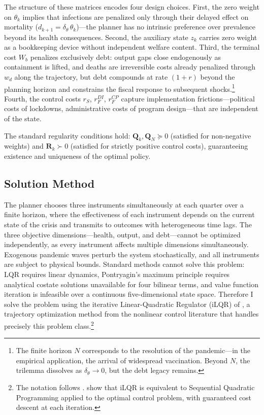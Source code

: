 \documentclass[12pt, a4paper]{article}
\begin{document}
\vspace{2mm}

\noindent The structure of these matrices encodes four design choices. First, the zero weight on $\theta_k$ implies that infections are penalized only through their delayed effect on mortality ($d_{k+1} = \delta_\theta\, \theta_k$)---the planner has no intrinsic
preference over prevalence beyond its health consequences. Second, the auxiliary state
$z_k$ carries zero weight as a bookkeeping device without independent welfare content.
Third, the terminal cost $W_b$ penalizes exclusively debt: output gaps close
endogenously as containment is lifted, and deaths are irreversible costs already
penalized through $w_d$ along the trajectory, but debt compounds at rate $(1+r)$
beyond the planning horizon and constrains the fiscal response to subsequent
shocks.\footnote{The finite horizon $N$ corresponds to the resolution of the
pandemic---in the empirical application, the arrival of widespread vaccination.
Beyond $N$, the trilemma dissolves as $\delta_\theta \to 0$, but the debt legacy
remains.} Fourth, the control costs $r_S$, $r_F^{DI}$, $r_F^{CP}$ capture
implementation frictions---political costs of lockdowns, administrative costs of
program design---that are independent of the state.

The standard regularity conditions hold: $\bm{Q}_k, \bm{Q}_N \succeq 0$ (satisfied
for non-negative weights) and $\bm{R}_k \succ 0$ (satisfied for strictly positive
control costs), guaranteeing existence and uniqueness of the optimal policy.


\subsection{Solution Method}
\label{sec:solution}

The planner chooses three instruments simultaneously at each quarter over a finite
horizon, where the effectiveness of each instrument depends on the current state of
the crisis and transmits to outcomes with heterogeneous time lags. The three
objective dimensions---health, output, and debt---cannot be optimized independently,
as every instrument affects multiple dimensions simultaneously. Exogenous pandemic
waves perturb the system stochastically, and all instruments are subject to physical
bounds. Standard methods cannot solve this problem: LQR requires linear dynamics,
Pontryagin's maximum principle requires analytical costate solutions unavailable for
four bilinear terms, and value function iteration is infeasible over a continuous
five-dimensional state space. Therefore I solve the problem using the iterative Linear-Quadratic Regulator (iLQR) of \citet{li2004iterative}, a trajectory optimization method from the nonlinear control literature that handles precisely this problem class.\footnote{The notation follows
\citet[Chapters~3--4]{bertsekas2017dynamic}. \citet{sharma2025sqp} show that iLQR
is equivalent to Sequential Quadratic Programming applied to the optimal control
problem, with guaranteed cost descent at each iteration.} 
\end{document}
